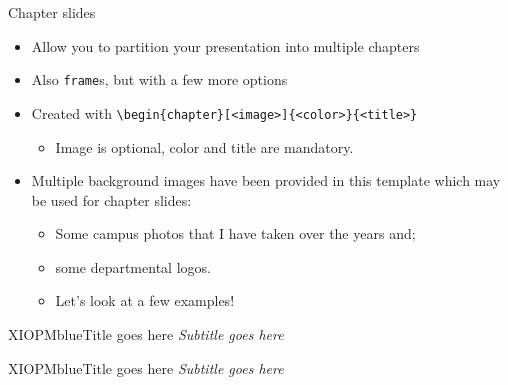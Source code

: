 \documentclass{beamer}
\begin{document}
\begin{frame}[fragile]{Chapter slides}
\begin{itemize}
\item Allow you to partition your presentation into multiple chapters
\item Also \verb|frame|s, but with a few more options
\item Created with \verb|\begin{chapter}[<image>]{<color>}{<title>}|
  \begin{itemize}
  \item Image is optional, color and title are mandatory.
  \end{itemize}
\item Multiple background images have been provided in this template which may be used for chapter slides:
  \begin{itemize}
  \item Some campus photos that I have taken over the years and;
  \item some departmental logos.
  \item Let's look at a few examples!
  \end{itemize}
\end{itemize}
\end{frame}


\begin{chapter}{XIOPMblue}{Title goes here}
\textit{Subtitle goes here}
\end{chapter}

\begin{chapter}{XIOPMblue}{Title goes here}
\textit{Subtitle goes here}
\end{chapter}

\backmatter
\end{document}
